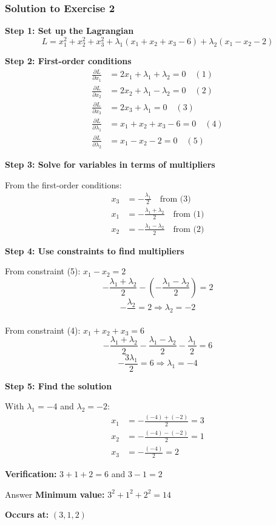 \documentclass[aspectratio=1610]{beamer}
\begin{document}
\begin{frame}[allowframebreaks]
\frametitle{Solution to Exercise 2}

\textbf{Step 1: Set up the Lagrangian}
$$L = x_1^2 + x_2^2 + x_3^2 + \lambda_1(x_1 + x_2 + x_3 - 6) + \lambda_2(x_1 - x_2 - 2)$$

\textbf{Step 2: First-order conditions}
\begin{align}
\frac{\partial L}{\partial x_1} &= 2x_1 + \lambda_1 + \lambda_2 = 0 \quad (1)\\
\frac{\partial L}{\partial x_2} &= 2x_2 + \lambda_1 - \lambda_2 = 0 \quad (2)\\
\frac{\partial L}{\partial x_3} &= 2x_3 + \lambda_1 = 0 \quad (3)\\
\frac{\partial L}{\partial \lambda_1} &= x_1 + x_2 + x_3 - 6 = 0 \quad (4)\\
\frac{\partial L}{\partial \lambda_2} &= x_1 - x_2 - 2 = 0 \quad (5)
\end{align}

\framebreak

\textbf{Step 3: Solve for variables in terms of multipliers}

From the first-order conditions:
\begin{align}
x_3 &= -\frac{\lambda_1}{2} \quad \text{from (3)}\\
x_1 &= -\frac{\lambda_1 + \lambda_2}{2} \quad \text{from (1)}\\
x_2 &= -\frac{\lambda_1 - \lambda_2}{2} \quad \text{from (2)}
\end{align}

\framebreak

\textbf{Step 4: Use constraints to find multipliers}

From constraint (5): $x_1 - x_2 = 2$
$$-\frac{\lambda_1 + \lambda_2}{2} - \left(-\frac{\lambda_1 - \lambda_2}{2}\right) = 2$$
$$-\frac{\lambda_2}{} = 2 \Rightarrow \lambda_2 = -2$$

From constraint (4): $x_1 + x_2 + x_3 = 6$
$$-\frac{\lambda_1 + \lambda_2}{2} - \frac{\lambda_1 - \lambda_2}{2} - \frac{\lambda_1}{2} = 6$$
$$-\frac{3\lambda_1}{2} = 6 \Rightarrow \lambda_1 = -4$$

\framebreak

\textbf{Step 5: Find the solution}

With $\lambda_1 = -4$ and $\lambda_2 = -2$:
\begin{align}
x_1 &= -\frac{(-4) + (-2)}{2} = 3\\
x_2 &= -\frac{(-4) - (-2)}{2} = 1\\
x_3 &= -\frac{(-4)}{2} = 2
\end{align}

\textbf{Verification:} $3 + 1 + 2 = 6$ and $3 - 1 = 2$ 

\vspace{0.5cm}
\begin{block}{Answer}
\textbf{Minimum value:} $3^2 + 1^2 + 2^2 = 14$

\textbf{Occurs at:} $(3, 1, 2)$
\end{block}

\end{frame}
\end{document}
